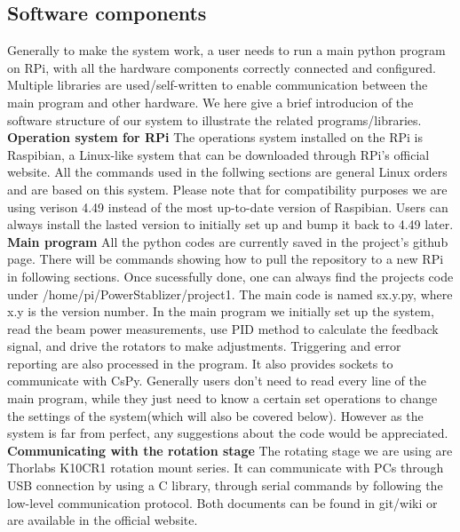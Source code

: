 \documentclass{article}
\begin{document}
\subsection{Software components}
Generally to make the system work, a user needs to run a main python program on RPi, with all the hardware components correctly connected and configured. Multiple libraries are used/self-written to enable communication between the main program and other hardware. We here give a brief introducion of the software structure of our system to illustrate the related programs/libraries.  \newline\newline
\textbf{Operation system for RPi}\newline
The operations system installed on the RPi is Raspibian, a Linux-like system that can be downloaded through RPi's official website. All the commands used in the follwing sections are general Linux orders and are based on this system. \newline
Please note that for compatibility purposes we are using verison 4.49 instead of the most up-to-date version of Raspibian. Users can always install the lasted version to initially set up and bump it back to 4.49 later.\newline\newline
\textbf{Main program}\newline
All the python codes are currently saved in the project's github page. There will be commands showing how to pull the repository to a new RPi in following sections. Once sucessfully done, one can always find the projects code under /home/pi/PowerStablizer/project1. \newline
The main code is named sx.y.py, where x.y is the version number. In the main program we initially set up the system, read the beam power measurements, use PID method to calculate the feedback signal, and drive the rotators to make adjustments. Triggering and error reporting are also processed in the program. It also provides sockets to communicate with CsPy. Generally users don't need to read every line of the main program, while they just need to know a certain set operations to change the settings of the system(which will also be covered below). However as the system is far from perfect, any suggestions about the code would be appreciated. \newline\newline
\textbf{Communicating with the rotation stage}\newline
The rotating stage we are using are Thorlabs K10CR1 rotation mount series. It can communicate with PCs through USB connection by using a C library, through serial commands by following the low-level communication protocol. Both documents can be found in git/wiki or are available in the official website. \newline
\end{document}

